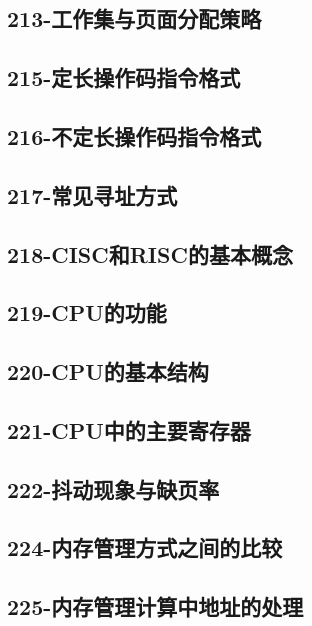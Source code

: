 \subsection{213-工作集与页面分配策略}

\subsection{215-定长操作码指令格式}

\subsection{216-不定长操作码指令格式}

\subsection{217-常见寻址方式}

\subsection{218-CISC和RISC的基本概念}

\subsection{219-CPU的功能}

\subsection{220-CPU的基本结构}

\subsection{221-CPU中的主要寄存器}

\subsection{222-抖动现象与缺页率}

\subsection{224-内存管理方式之间的比较}

\subsection{225-内存管理计算中地址的处理}

